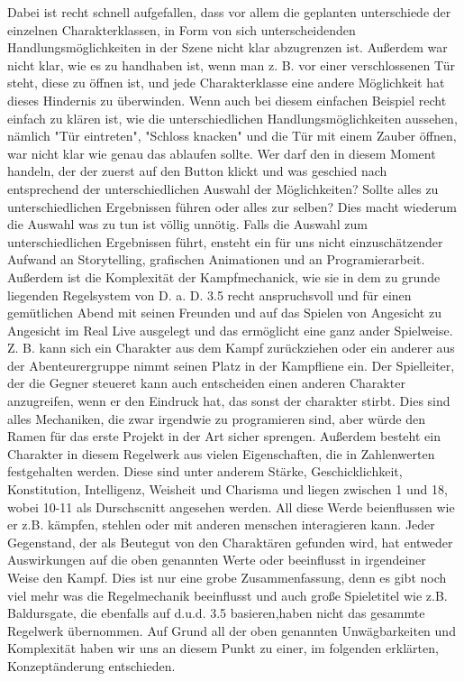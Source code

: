 Dabei ist recht schnell aufgefallen, dass vor allem die geplanten unterschiede der einzelnen Charakterklassen, in Form von sich unterscheidenden Handlungsmöglichkeiten in der Szene nicht klar abzugrenzen ist. Außerdem war nicht klar, wie es zu handhaben ist, wenn man z. B. vor einer verschlossenen Tür steht, diese zu öffnen ist, und jede Charakterklasse eine andere Möglichkeit hat dieses Hindernis zu überwinden. Wenn auch bei diesem einfachen Beispiel recht einfach zu klären ist, wie die unterschiedlichen Handlungsmöglichkeiten aussehen, nämlich "Tür eintreten", "Schloss knacken" und die Tür mit einem Zauber öffnen, war nicht klar wie genau das ablaufen sollte. Wer darf den in diesem Moment handeln, der der zuerst auf den Button klickt und was geschied nach entsprechend der unterschiedlichen Auswahl der Möglichkeiten? Sollte alles zu unterschiedlichen Ergebnissen führen oder alles zur selben? Dies macht wiederum die Auswahl was zu tun ist völlig unnötig. Falls die Auswahl zum unterschiedlichen Ergebnissen führt, ensteht ein für uns nicht einzuschätzender Aufwand an Storytelling, grafischen Animationen und an Programierarbeit. Außerdem ist die Komplexität der Kampfmechanick, wie sie in dem zu grunde liegenden Regelsystem von D. a. D. 3.5 recht anspruchsvoll und für einen gemütlichen Abend mit seinen Freunden und auf das Spielen von Angesicht zu Angesicht im Real Live ausgelegt und das ermöglicht eine ganz ander Spielweise. Z. B. kann sich ein Charakter aus dem Kampf zurückziehen oder ein anderer aus der Abenteurergruppe nimmt seinen Platz in der Kampfliene ein. Der Spielleiter, der die Gegner steueret kann auch entscheiden einen anderen Charakter anzugreifen, wenn er den Eindruck hat, das sonst der charakter stirbt. Dies sind alles Mechaniken, die zwar irgendwie zu programieren sind, aber würde den Ramen für das erste Projekt in der Art sicher sprengen.
Außerdem besteht ein Charakter in diesem Regelwerk aus vielen Eigenschaften, die in Zahlenwerten festgehalten werden. Diese sind unter anderem Stärke, Geschicklichkeit, Konstitution, Intelligenz, Weisheit und Charisma und liegen zwischen 1 und 18, wobei 10-11 als Durschscnitt angesehen werden. All diese Werde beienflussen wie er z.B. kämpfen, stehlen oder mit anderen menschen interagieren kann. Jeder Gegenstand, der als Beutegut von den Charaktären gefunden wird, hat entweder Auswirkungen auf die oben genannten Werte oder beeinflusst in irgendeiner Weise den Kampf. Dies ist nur eine grobe Zusammenfassung, denn es gibt noch viel mehr was die Regelmechanik beeinflusst und auch große Spieletitel wie z.B. Baldursgate, die ebenfalls auf d.u.d. 3.5 basieren,haben nicht das gesammte Regelwerk übernommen. 
Auf Grund all der oben genannten Unwägbarkeiten und Komplexität haben wir uns an diesem Punkt zu einer, im folgenden erklärten, Konzeptänderung entschieden.

